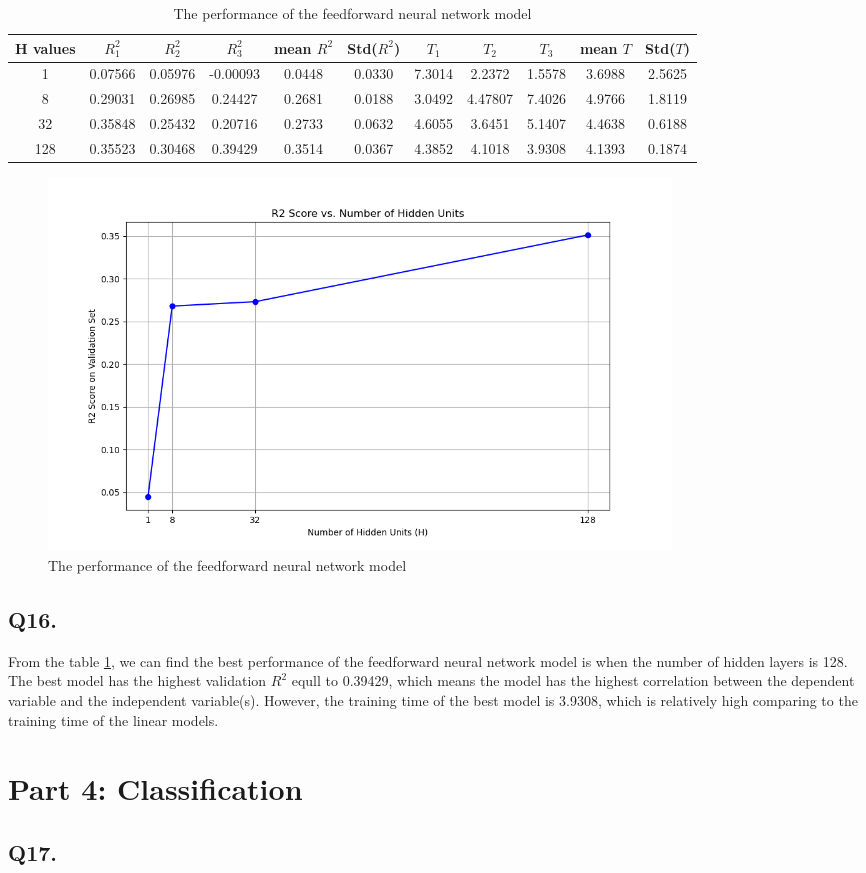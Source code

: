 \documentclass{article}
\begin{document}
\begin{table}[h!]
    \centering
    \small
    \begin{tabular}{|c|c|c|c|c|c|c|c|c|c|c|}
        \hline
        H values & $R^2_1$ & $R^2_2$ & $R^2_3$ & mean $R^2$ & Std($R^2$) & $T_1$ & $T_2$ & $T_3$ & mean $T$ & Std($T$) \\
        \hline
        1 & 0.07566 & 0.05976 &  -0.00093 & 0.0448 & 0.0330 & 7.3014 & 2.2372 & 1.5578  & 3.6988 & 2.5625\\
        8 & 0.29031 & 0.26985 & 0.24427 & 0.2681 & 0.0188 & 3.0492 & 4.47807 & 7.4026 & 4.9766 & 1.8119 \\
        32 & 0.35848 & 0.25432 & 0.20716 & 0.2733 & 0.0632 & 4.6055 & 3.6451 & 5.1407 & 4.4638 & 0.6188 \\
        128 & 0.35523 & 0.30468& 0.39429 & 0.3514 & 0.0367 & 4.3852 & 4.1018 & 3.9308 & 4.1393 & 0.1874 \\
        \hline
    \end{tabular}
    \caption{The performance of the feedforward neural network model}
    \label{tab:Feedforward}
\end{table}

\begin{figure}[h!]
    \centering
    \includegraphics[width=0.8\textwidth]{./pic/R2_Score_vs_Hidden_Units.png}
    \caption{The performance of the feedforward neural network model}
    \label{fig:feedforward}
\end{figure}


\subsection*{Q16.}

From the table \ref{tab:Feedforward}, we can find the best performance of the feedforward neural network model is when the number of hidden layers is 128.
The best model has the highest validation $R^2$ equll to 0.39429, which means the model has the highest correlation between the dependent variable and the independent variable(s).
However, the training time of the best model is 3.9308, which is relatively high comparing to the training time of the linear models.



\newpage

\section*{Part 4: Classification}

\subsection*{Q17.}
\end{document}
